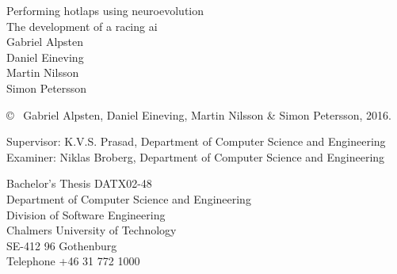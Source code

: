 \newpage
\thispagestyle{plain}
\vspace*{4.5cm}
Performing hotlaps using neuroevolution\\
The development of a racing ai\\
{\large Gabriel Alpsten}\\
{\large Daniel Eineving}\\
{\large Martin Nilsson}\\
{\large Simon Petersson}

\copyright ~ Gabriel Alpsten, Daniel Eineving, Martin Nilsson \& Simon Petersson, 2016. \setlength{\parskip}{1cm}

Supervisor: K.V.S. Prasad, Department of Computer Science and Engineering\\
Examiner: Niklas Broberg, Department of Computer Science and Engineering \setlength{\parskip}{1cm}

Bachelor's Thesis DATX02-48 \\
Department of Computer Science and Engineering\\
Division of Software Engineering\\
Chalmers University of Technology\\
SE-412 96 Gothenburg\\
Telephone +46 31 772 1000 \setlength{\parskip}{0.5cm}

\vfill



